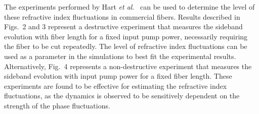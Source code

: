 The experiments performed by Hart {\it et al}.\ \cite{hart1} can be used to
determine the level of these refractive index fluctuations in commercial
fibers. Results described in Figs.\ 2 and 3 represent a destructive
experiment that measures the sideband evolution with fiber length for a fixed
input pump power, necessarily requiring the fiber to be cut repeatedly. The
level of refractive index fluctuations can be used as a parameter in the
simulations to best fit the experimental results. Alternatively, Fig.\ 4
represents a non-destructive experiment that measures the sideband evolution
with input pump power for a fixed fiber length. These experiments are found to
be effective for estimating the refractive index fluctuations, as the dynamics
is observed to be sensitively dependent on the strength of the phase
fluctuations.
